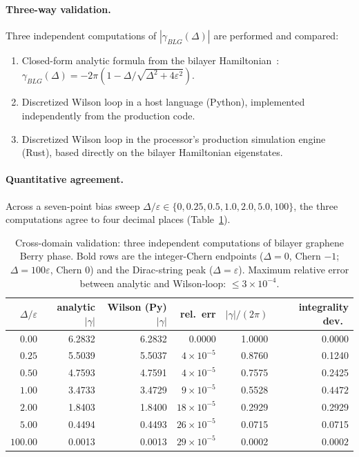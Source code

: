 \documentclass[11pt,letterpaper]{article}
\begin{document}
\paragraph{Three-way validation.}
Three independent computations of $|\gamma_{BLG}(\Delta)|$ are
performed and compared:
\begin{enumerate}[nosep]
\item Closed-form analytic formula from the bilayer
  Hamiltonian~\cite{mccann2013bilayer}:
  $\gamma_{BLG}(\Delta)
  = -2\pi (1 - \Delta / \sqrt{\Delta^2 + 4\varepsilon^2})$.
\item Discretized Wilson loop in a host language (Python),
  implemented independently from the production code.
\item Discretized Wilson loop in the processor's production
  simulation engine (Rust), based directly on the bilayer
  Hamiltonian eigenstates.
\end{enumerate}

\paragraph{Quantitative agreement.}
Across a seven-point bias sweep $\Delta/\varepsilon \in \{0, 0.25,
0.5, 1.0, 2.0, 5.0, 100\}$, the three computations agree to four
decimal places (Table~\ref{tab:dpu-validation}).

\begin{table}[h]
\centering
\small
\begin{tabular}{rrrrrr}
\toprule
$\Delta/\varepsilon$ & analytic $|\gamma|$ & Wilson (Py) $|\gamma|$
& rel.\ err & $|\gamma|/(2\pi)$ & integrality dev.\ \\
\midrule
$0.00$    & 6.2832 & 6.2832 & 0.0000 & 1.0000 & $\mathbf{0.0000}$ \\
$0.25$    & 5.5039 & 5.5037 & $4 \times 10^{-5}$  & 0.8760 & 0.1240 \\
$0.50$    & 4.7593 & 4.7591 & $4 \times 10^{-5}$  & 0.7575 & 0.2425 \\
$1.00$    & 3.4733 & 3.4729 & $9 \times 10^{-5}$  & 0.5528 & $\mathbf{0.4472}$ \\
$2.00$    & 1.8403 & 1.8400 & $18 \times 10^{-5}$ & 0.2929 & 0.2929 \\
$5.00$    & 0.4494 & 0.4493 & $26 \times 10^{-5}$ & 0.0715 & 0.0715 \\
$100.00$  & 0.0013 & 0.0013 & $29 \times 10^{-5}$ & 0.0002 & $\mathbf{0.0002}$ \\
\bottomrule
\end{tabular}
\caption{Cross-domain validation: three independent computations of
bilayer graphene Berry phase. Bold rows are the integer-Chern
endpoints ($\Delta = 0$, Chern $-1$; $\Delta = 100\varepsilon$,
Chern $0$) and the Dirac-string peak ($\Delta = \varepsilon$).
Maximum relative error between analytic and Wilson-loop:
$\leq 3 \times 10^{-4}$.}
\label{tab:dpu-validation}
\end{table}
\end{document}
